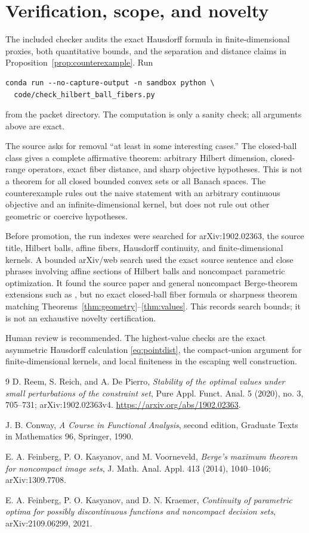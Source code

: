 \documentclass[11pt]{article}
\begin{document}
\section{Verification, scope, and novelty}

The included checker audits the exact Hausdorff formula in finite-dimensional
proxies, both quantitative bounds, and the separation and distance claims in
Proposition~\ref{prop:counterexample}.  Run
\begin{verbatim}
conda run --no-capture-output -n sandbox python \
  code/check_hilbert_ball_fibers.py
\end{verbatim}
from the packet directory.  The computation is only a sanity check; all
arguments above are exact.

The source asks for removal ``at least in some interesting cases.''  The
closed-ball class gives a complete affirmative theorem: arbitrary Hilbert
dimension, closed-range operators, exact fiber distance, and sharp objective
hypotheses.  This is not a theorem for all closed bounded convex sets or all
Banach spaces.  The counterexample rules out the naive statement with an
arbitrary continuous objective and an infinite-dimensional kernel, but does
not rule out other geometric or coercive hypotheses.

Before promotion, the run indexes were searched for arXiv:1902.02363, the
source title, Hilbert balls, affine fibers, Hausdorff continuity, and
finite-dimensional kernels.  A bounded arXiv/web search used the exact source
sentence and close phrases involving affine sections of Hilbert balls and
noncompact parametric optimization.  It found the source paper and general
noncompact Berge-theorem extensions such as \cite{FKV,FKK}, but no exact
closed-ball fiber formula or sharpness theorem matching
Theorems~\ref{thm:geometry}--\ref{thm:values}.  This records search bounds; it
is not an exhaustive novelty certification.

Human review is recommended.  The highest-value checks are the exact
asymmetric Hausdorff calculation \eqref{eq:pointdist}, the compact-union
argument for finite-dimensional kernels, and local finiteness in the escaping
well construction.

\begin{thebibliography}{9}
D. Reem, S. Reich, and A. De Pierro,
\emph{Stability of the optimal values under small perturbations of the
constraint set}, Pure Appl. Funct. Anal. 5 (2020), no. 3, 705--731;
arXiv:1902.02363v4.
\url{https://arxiv.org/abs/1902.02363}.

J. B. Conway, \emph{A Course in Functional Analysis}, second edition,
Graduate Texts in Mathematics 96, Springer, 1990.

E. A. Feinberg, P. O. Kasyanov, and M. Voorneveld,
\emph{Berge's maximum theorem for noncompact image sets},
J. Math. Anal. Appl. 413 (2014), 1040--1046; arXiv:1309.7708.

E. A. Feinberg, P. O. Kasyanov, and D. N. Kraemer,
\emph{Continuity of parametric optima for possibly discontinuous functions
and noncompact decision sets}, arXiv:2109.06299, 2021.
\end{thebibliography}
\end{document}
